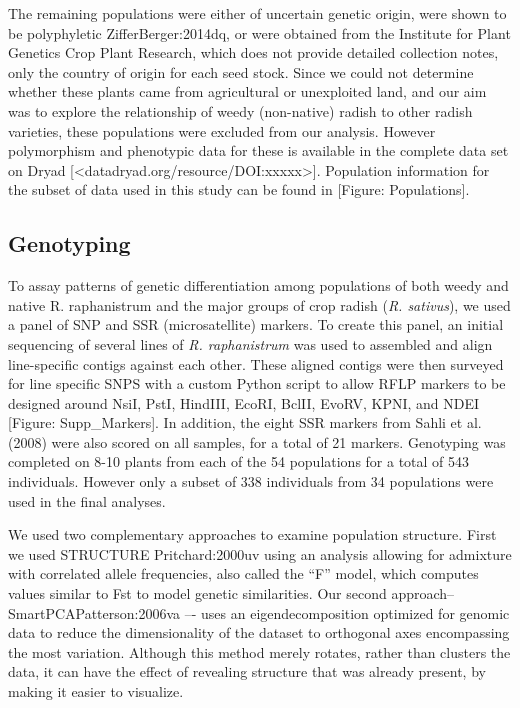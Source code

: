 \documentclass[twocolumn]{bmcart}%
\begin{document}
The remaining populations were either of uncertain genetic origin, were shown to be polyphyletic {ZifferBerger:2014dq}, or were obtained from the Institute for Plant Genetics Crop Plant Research, which does not provide detailed collection notes, only the country of origin for each seed stock. Since we could not determine whether these plants came from agricultural or unexploited land, and our aim was to explore the relationship of weedy (non-native) radish to other radish varieties, these populations were excluded from our analysis. However polymorphism and phenotypic data for these is available in the complete data set on Dryad [<datadryad.org/resource/DOI:xxxxx>]. Population information for the subset of data used in this study can be found in [Figure: Populations].

\subsection*{Genotyping}

To assay patterns of genetic differentiation among populations of both weedy and native R. raphanistrum and the major groups of crop radish (\textit{R. sativus}), we used a panel of SNP and SSR (microsatellite) markers. To create this panel, an initial sequencing of several lines of \textit{R. raphanistrum} was used to assembled and align line-specific contigs against each other. These aligned contigs were then surveyed for line specific SNPS with a custom Python script to allow RFLP markers to be designed around NsiI, PstI, HindIII, EcoRI, BclII, EvoRV, KPNI, and NDEI [Figure: Supp\_Markers]. In addition, the eight SSR markers from Sahli et al. (2008) were also scored on all samples, for a total of 21 markers. Genotyping was completed on 8-10 plants from each of the 54 populations for a total of 543 individuals. However only a subset of 338 individuals from 34 populations were used in the final analyses.
%
%
%
%
%
%
%
%
%

We used two complementary approaches to examine population structure. First we used STRUCTURE {Pritchard:2000uv} using an analysis allowing for admixture with correlated allele frequencies, also called the “F” model, which computes values similar to Fst to model genetic similarities. Our second approach–SmartPCA{Patterson:2006va} –- uses an eigendecomposition optimized for genomic data to reduce the dimensionality of the dataset to orthogonal axes encompassing the most variation. Although this method merely rotates, rather than clusters the data, it can have the effect of revealing structure that was already present, by making it easier to visualize.
\end{document}
